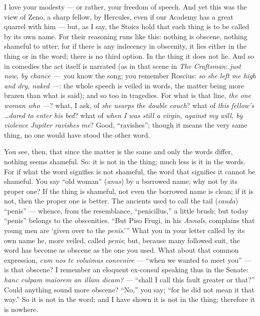 

 I love your modesty --- or rather, your freedom of speech. And yet this was the view of Zeno, a sharp fellow, by Hercules, even if our Academy has a great quarrel with him --- but, as I say, the Stoics hold that each thing is to be called by its own name. For their reasoning runs like this: nothing is obscene, nothing shameful to utter; for if there is any indecency in obscenity, it lies either in the thing or in the word; there is no third option. In the thing it does not lie. And so in comedies the act itself is narrated (as in that scene in \textit{The Craftsman}: \textit{just now, by chance ---} \,you know the song; you remember Roscius: \textit{so she left me high and dry, naked ---}: the whole speech is veiled in words, the matter being more brazen than what is said); and so too in tragedies. For what is that line, \textit{the one woman who ---}? what, I ask, of \textit{she usurps the double couch}? what of \textit{this fellow's \dots dared to enter his bed}? what of \textit{when I was still a virgin, against my will, by violence Jupiter ravishes me}? Good, ``ravishes''; though it means the very same thing, no one would have stood the other word.

 You see, then, that since the matter is the same and only the words differ, nothing seems shameful. So: it is not in the thing; much less is it in the words. For if what the word signifies is not shameful, the word that signifies it cannot be shameful. You say ``old woman'' (\textit{anus}) by a borrowed name; why not by its proper one? If the thing is shameful, not even the borrowed name is clean; if it is not, then the proper one is better. The ancients used to call the tail (\textit{cauda}) ``penis'' --- whence, from the resemblance, ``penicillus,'' a little brush; but today ``penis'' belongs to the obscenities. ``But Piso Frugi, in his \textit{Annals}, complains that young men are `given over to the \textit{penis}.''' What you in your letter called by its own name he, more veiled, called \textit{penis}; but, because many followed suit, the word has become as obscene as the one you used. What about that common expression, \textit{cum nos te voluimus convenire} --- ``when we wanted to meet you'' --- is that obscene? I remember an eloquent ex-consul speaking thus in the Senate: \textit{hanc culpam maiorem an illam dicam?} --- ``shall I call this fault greater or that?'' Could anything sound more obscene? ``No,'' you say; ``for he did not mean it that way.'' So it is not in the word; and I have shown it is not in the thing; therefore it is nowhere.


